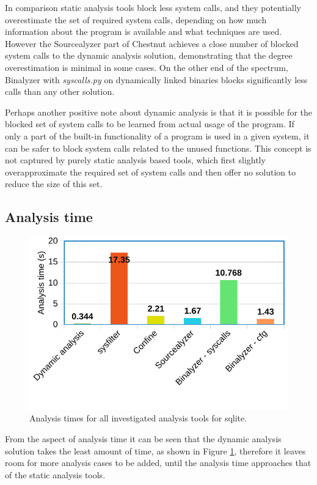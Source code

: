 In comparison static analysis tools block less system calls, and they potentially overestimate the set of required system calls, depending on how much information about the program is available and what techniques are used.
However the Sourcealyzer part of Chestnut achieves a close number of blocked system calls to the dynamic analysis solution, demonstrating that the degree overestimation is minimal in some cases.
On the other end of the spectrum, Binalyzer with \textit{syscalls.py} on dynamically linked binaries blocks significantly less calls than any other solution.

Perhaps another positive note about dynamic analysis is that it is possible for the blocked set of system calls to be learned from actual usage of the program. If only a part of the built-in functionality of a program is used in a given system, it can be safer to block system calls related to the unused functions. This concept is not captured by purely static analysis based tools, which first slightly overapproximate the required set of system calls and then offer no solution to reduce the size of this set.

\subsection {Analysis time}
\begin{figure}
    \centering
    \includegraphics[width=\columnwidth]{./chart_timings.png}
    \caption{Analysis times for all investigated analysis tools for sqlite.}
    \label{fig:timings}
\end{figure}
From the aspect of analysis time it can be seen that the dynamic analysis solution takes the least amount of time, as shown in Figure \ref{fig:timings}, therefore it leaves room for more analysis cases to be added, until the analysis time approaches that of the static analysis tools.


